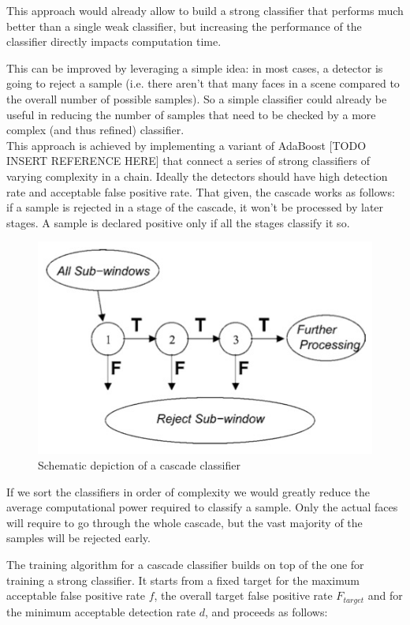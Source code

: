 \documentclass[a4paper,11pt,titlepage]{article}
\begin{document}
This approach would already allow to build a strong classifier that performs
much better than a single weak classifier, but increasing the performance of the
classifier directly impacts computation time.

This can be improved by leveraging a simple idea: in most cases, a detector is
going to reject a sample (i.e. there aren't that many faces in a scene compared
to the overall number of possible samples). So a simple classifier could already
be useful in reducing the number of samples that need to be checked by a more
complex (and thus refined) classifier. \\
This approach is achieved by implementing a variant of AdaBoost [TODO INSERT
REFERENCE HERE] that connect a series of strong classifiers of varying
complexity in a chain. Ideally the detectors should have high detection rate and
acceptable false positive rate. That given, the cascade works as follows: if a
sample is rejected in a stage of the cascade, it won't be processed by later
stages. A sample is declared positive only if all the stages classify it so.

\begin{figure}[h]
  \centering
  \includegraphics[scale=0.5]{cascade_classifier.jpg}
  \caption{Schematic depiction of a cascade classifier}
  \label{fig:cascade_classifier}
\end{figure}

If we sort the classifiers in order of complexity we would greatly reduce the
average computational power required to classify a sample. Only the actual faces
will require to go through the whole cascade, but the vast majority of the
samples will be rejected early.

The training algorithm for a cascade classifier builds on top of the one for
training a strong classifier. It starts from a fixed target for the maximum
acceptable false positive rate $f$, the overall target false positive rate
$F_{target}$ and for the minimum acceptable detection rate $d$, and proceeds as
follows:
\end{document}
